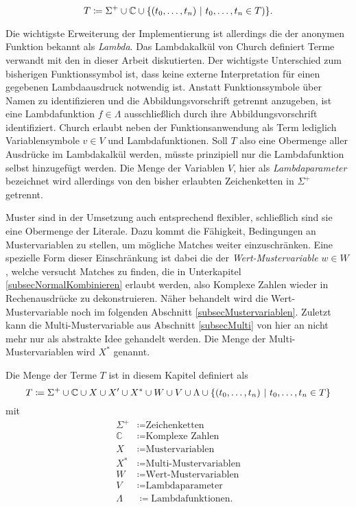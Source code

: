 $$T \coloneqq \Sigma^+ \cup \mathbb C \cup \curl*{(\elems t 0 n)~|~ \elems t 0 n \in T)}.$$

Die wichtigste Erweiterung der Implementierung ist allerdings die der anonymen Funktion bekannt als \emph{Lambda}. Das Lambdakalkül von Church \cite{ChurchLambda36} definiert Terme verwandt mit den in dieser Arbeit diskutierten. Der wichtigste Unterschied zum bisherigen Funktionssymbol ist, dass keine externe Interpretation für einen gegebenen Lambdaausdruck notwendig ist. Anstatt Funktionssymbole über Namen zu identifizieren und die Abbildungsvorschrift getrennt anzugeben, ist eine Lambdafunktion $f \in \Lambda$ ausschließlich durch ihre Abbildungsvorschrift identifiziert. Church erlaubt neben der Funktionsanwendung als Term lediglich Variablensymbole  $v \in V$ und Lambdafunktionen. Soll $T$ also eine Obermenge aller Ausdrücke im Lambdakalkül werden, müsste prinzipiell nur die Lambdafunktion selbst hinzugefügt werden. Die Menge der Variablen $V$, hier als \emph{Lambdaparameter} bezeichnet wird allerdings von den bisher erlaubten Zeichenketten in $\Sigma^+$ getrennt.

Muster sind in der Umsetzung auch entsprechend flexibler, schließlich sind sie eine Obermenge der Literale. Dazu kommt die Fähigkeit, Bedingungen an Mustervariablen zu stellen, um mögliche Matches weiter einzuschränken. Eine spezielle Form dieser Einschränkung ist dabei die der \emph{Wert-Mustervariable} $w \in W$, welche versucht Matches zu finden, die in Unterkapitel \ref{subsecNormalKombinieren} erlaubt werden, also Komplexe Zahlen wieder in Rechenausdrücke zu dekonstruieren. Näher behandelt wird die Wert-Mustervariable noch im folgenden Abschnitt \ref{subsecMustervariablen}. 
Zuletzt kann die Multi-Mustervariable aus Abschnitt \ref{subsecMulti} von hier an nicht mehr nur als abstrakte Idee gehandelt werden. Die Menge der Multi-Mustervariablen wird $X^*$ genannt. 

\begin{definition} \label{defKnotentypenMathe}
Die Menge der Terme $T$ ist in diesem Kapitel definiert als
$$T \coloneqq \Sigma^+ \cup \mathbb C \cup X \cup X' \cup X^* \cup W \cup V \cup \Lambda \cup \curl*{(\elems t 0 n)~|~ \elems t 0 n \in T}$$
mit
\begin{align*}
    \Sigma^+  &\coloneqq \text{Zeichenketten}\\
    \mathbb C &\coloneqq \text{Komplexe Zahlen}\\
    X         &\coloneqq \text{Mustervariablen}\\
    X^*       &\coloneqq \text{Multi-Mustervariablen}\\
    W         &\coloneqq \text{Wert-Mustervariablen}\\
    V         &\coloneqq \text{Lambdaparameter}\\
    \Lambda   &\coloneqq \text{Lambdafunktionen}.
\end{align*}
\end{definition}






